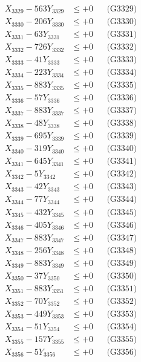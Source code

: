 \documentclass[a4paper,10pt]{article}
\begin{document}
{\begin{align}
X_{3329} - 563Y_{3329} &\leq +0 && \text{(G3329)} \\
X_{3330} - 206Y_{3330} &\leq +0 && \text{(G3330)} \\
\allowbreak
X_{3331} - 63Y_{3331} &\leq +0 && \text{(G3331)} \\
X_{3332} - 726Y_{3332} &\leq +0 && \text{(G3332)} \\
X_{3333} - 41Y_{3333} &\leq +0 && \text{(G3333)} \\
X_{3334} - 223Y_{3334} &\leq +0 && \text{(G3334)} \\
X_{3335} - 883Y_{3335} &\leq +0 && \text{(G3335)} \\
X_{3336} - 57Y_{3336} &\leq +0 && \text{(G3336)} \\
X_{3337} - 883Y_{3337} &\leq +0 && \text{(G3337)} \\
X_{3338} - 48Y_{3338} &\leq +0 && \text{(G3338)} \\
X_{3339} - 695Y_{3339} &\leq +0 && \text{(G3339)} \\
X_{3340} - 319Y_{3340} &\leq +0 && \text{(G3340)} \\
\allowbreak
X_{3341} - 645Y_{3341} &\leq +0 && \text{(G3341)} \\
X_{3342} - 5Y_{3342} &\leq +0 && \text{(G3342)} \\
X_{3343} - 42Y_{3343} &\leq +0 && \text{(G3343)} \\
X_{3344} - 77Y_{3344} &\leq +0 && \text{(G3344)} \\
X_{3345} - 432Y_{3345} &\leq +0 && \text{(G3345)} \\
X_{3346} - 405Y_{3346} &\leq +0 && \text{(G3346)} \\
X_{3347} - 883Y_{3347} &\leq +0 && \text{(G3347)} \\
X_{3348} - 256Y_{3348} &\leq +0 && \text{(G3348)} \\
X_{3349} - 883Y_{3349} &\leq +0 && \text{(G3349)} \\
X_{3350} - 37Y_{3350} &\leq +0 && \text{(G3350)} \\
\allowbreak
X_{3351} - 883Y_{3351} &\leq +0 && \text{(G3351)} \\
X_{3352} - 70Y_{3352} &\leq +0 && \text{(G3352)} \\
X_{3353} - 449Y_{3353} &\leq +0 && \text{(G3353)} \\
X_{3354} - 51Y_{3354} &\leq +0 && \text{(G3354)} \\
X_{3355} - 157Y_{3355} &\leq +0 && \text{(G3355)} \\
X_{3356} - 5Y_{3356} &\leq +0 && \text{(G3356)} \\

\end{align}}
\end{document}
